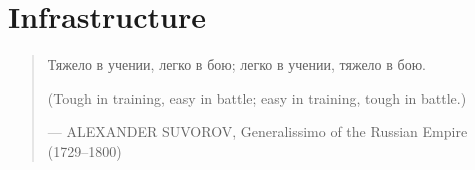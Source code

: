 
\chapter{Infrastructure}

\begin{quotation}

\footnotesize\sffamily\itshape

\begin{flushright}


Тяжело в учении, легко в бою; легко в учении, тяжело в бою.


\smallbreak

(Tough in training, easy in battle; easy in training, tough in battle.)

\smallbreak

\upshape

--- ALEXANDER SUVOROV, Generalissimo of the Russian Empire (1729--1800)

\end{flushright}

\end{quotation}









